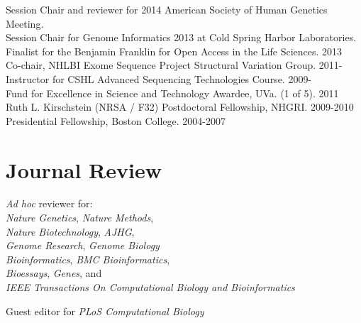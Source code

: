 \documentclass[margin,line]{cv}
\begin{document}
\begin{resume}
    Session Chair and reviewer for 2014 American Society of Human Genetics Meeting. \\\vspace{1mm}%
    Session Chair for Genome Informatics 2013 at Cold Spring Harbor Laboratories. \\\vspace{1mm}%
	Finalist for the Benjamin Franklin for Open Access in the Life Sciences. 2013 \\\vspace{1mm}%
    Co-chair, NHLBI Exome Sequence Project Structural Variation Group. 2011-                           \\\vspace{1mm}%
    Instructor for CSHL Advanced Sequencing Technologies Course. 2009-                                 \\\vspace{1mm}%
    Fund for Excellence in Science and Technology Awardee, UVa. (1 of 5). 2011                         \\\vspace{1mm}%
    Ruth L. Kirschstein (NRSA / F32) Postdoctoral Fellowship, NHGRI. 2009-2010                         \\\vspace{1mm}%
    Presidential Fellowship, Boston College. 2004-2007                                                               %


    \section{\mysidestyle Journal Review}
    \textit{Ad hoc} reviewer for:\\
        \textit{Nature Genetics}, \textit{Nature Methods},\\
        \textit{Nature Biotechnology}, \textit{AJHG}, \\
        \textit{Genome Research}, \textit{Genome Biology}\\
	      \textit{Bioinformatics}, \textit{BMC Bioinformatics},\\
          \textit{Bioessays}, \textit{Genes}, and \\
        \textit{IEEE Transactions On Computational Biology and Bioinformatics}

    Guest editor for \textit{PLoS Computational Biology}


\end{resume}
\end{document}
